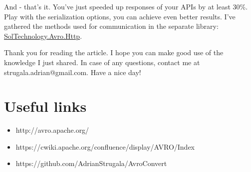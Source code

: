 \documentclass[]{article}
\begin{document}
And - that's it. You've just speeded up responses of your APIs by at least 30\%. Play with the serialization options, you can achieve even better results. I've gathered the methods used for communication in the separate library: \href{https://www.nuget.org/packages/SolTechnology.Avro.Http}{SolTechnology.Avro.Http}.

Thank you for reading the article. I hope you can make good use of the knowledge I just shared. In case of any questions, contact me at strugala.adrian@gmail.com. Have a nice day!

\section{Useful links}
\begin{itemize}
	\item http://avro.apache.org/
	\item https://cwiki.apache.org/confluence/display/AVRO/Index
	\item https://github.com/AdrianStrugala/AvroConvert
\end{itemize}
\end{document}
